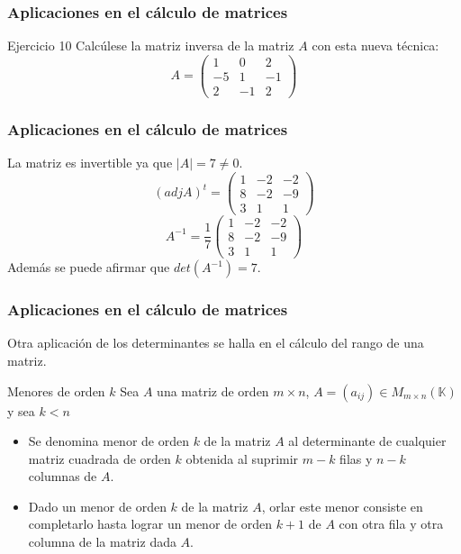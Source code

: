 \documentclass[aspectratio=169]{beamer}
\begin{document}
  \begin{frame}
  \frametitle{Aplicaciones en el c\'alculo de matrices}
     \begin{block}{Ejercicio 10}
Calc\'ulese la matriz inversa de la matriz $A$ con esta nueva t\'ecnica:
\[A=\left(\begin{array}{ccc}1 & 0 & 2 \\-5 & 1 & -1 \\2 & -1 & 2\end{array}\right)\]
\end{block}
\end{frame}   
  
  
  
    \begin{frame}
  \frametitle{Aplicaciones en el c\'alculo de matrices}
    La matriz es invertible ya que $|A| = 7\neq 0$. 
\[(adjA)^t=\left(\begin{array}{ccc}1 & -2 & -2 \\8 & -2 & -9 \\3 & 1 & 1\end{array}\right)\]
\[A^{-1}=\frac{1}{7}\left(\begin{array}{ccc}1 & -2 & -2 \\8 & -2 & -9 \\3 & 1 & 1\end{array}\right)\]
Adem\'as se puede afirmar que $det(A^{-1}) = 7$.
\end{frame}   
  
    \begin{frame}
  \frametitle{Aplicaciones en el c\'alculo de matrices}
  Otra aplicaci\'on de los determinantes se halla en el c\'alculo del rango de una matriz.
     \begin{block}{Menores de orden $k$}
Sea $A$ una matriz de orden $m\times n$, $A=(a_{ij})\in M_{m\times n}(\mathbb{K})$ y sea $k<n$
\begin{itemize}
\item Se denomina menor de orden $k$ de la matriz $A$ al determinante de cualquier matriz cuadrada de orden $k$ obtenida al suprimir $m-k$ filas y $n-k$ columnas de $A$. 
\item Dado un menor de orden $k$ de la matriz $A$, orlar este menor consiste en completarlo hasta lograr un menor de orden $k+1$ de $A$ con otra fila y otra columna de la matriz dada $A$.
\end{itemize}
\end{block}
\end{frame}   
  
\end{document}
